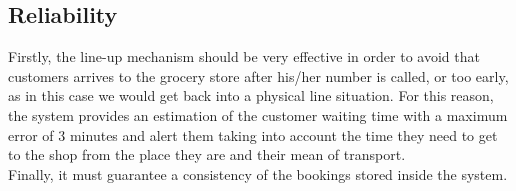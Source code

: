 \subsection{Reliability}

Firstly, the line-up mechanism should be very effective in order to avoid that customers arrives to the grocery store after his/her number is called, or too early, as in this case we would get back into a physical line situation. For this reason, the system provides an estimation of the customer waiting time with a maximum error of 3 minutes and alert them taking into account the time they need to get to the shop from the place they are and their mean of transport.\\
Finally, it must guarantee a consistency of the bookings stored inside the system.
